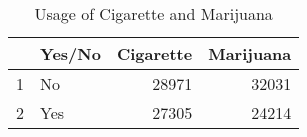 \begin{table}[ht]
\centering
\begin{tabular}{rlrr}
  \hline
 & Yes/No & Cigarette & Marijuana \\ 
  \hline
1 & No & 28971 & 32031 \\ 
  2 & Yes & 27305 & 24214 \\ 
   \hline
\end{tabular}
\caption{Usage of Cigarette and Marijuana}
\end{table}

